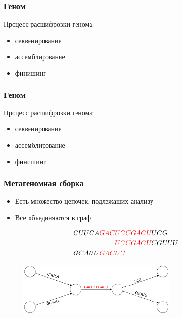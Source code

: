 \documentclass{beamer}
\begin{document}
    \begin{frame}
        \frametitle{Геном}
        Процесс расшифровки генома:
        \begin{itemize}
            \item секвенирование
            \item ассемблирование
            \item финишинг
        \end{itemize}
    \end{frame}
    
    \begin{frame}
        \frametitle{Геном}
        Процесс расшифровки генома:
        \begin{itemize}
            \item секвенирование
            \item ассемблирование
            \item финишинг
        \end{itemize}
    \end{frame}


    
    \begin{frame}
        \frametitle{Метагеномная сборка}
        \begin{itemize}
            \item Есть множество цепочек, подлежащих анализу
            \item Все объединяются в граф
        \end{itemize}
        
        \begin{figure}[t]
            \begin{align*}
                CUUCA {\color{red} GAC} &{\color{red} UCCGACU}  UCG \\
                                        &{\color{red} UCCGACU} CGUUU \\
                GCAUU {\color{red} GAC} &{\color{red} UC}
            \end{align*}
        \end{figure}
        
        \begin{figure}[b]
            \centering
            \includegraphics[width=8cm]{pictures/methagenEx.pdf}  
        \end{figure}
          
        
    \end{frame}
\end{document}
